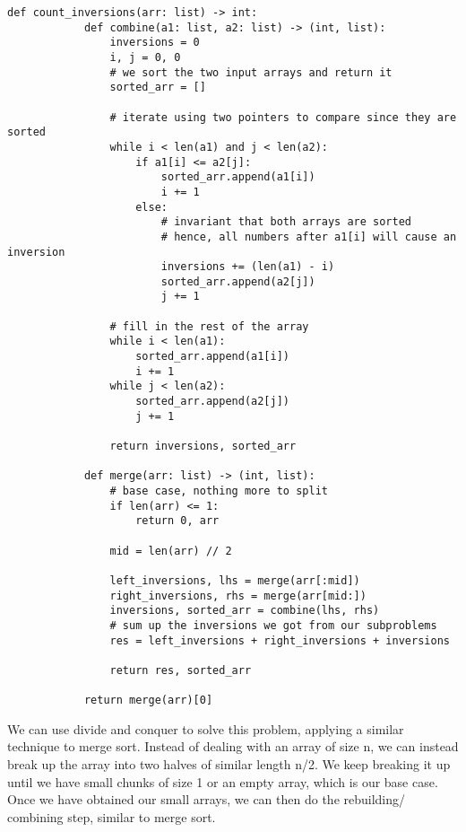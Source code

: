 \documentclass[12pt,letterpaper]{article}
\begin{document}
    \begin{lstlisting}[style = Python]
        def count_inversions(arr: list) -> int:
            def combine(a1: list, a2: list) -> (int, list):
                inversions = 0
                i, j = 0, 0
                # we sort the two input arrays and return it
                sorted_arr = []

                # iterate using two pointers to compare since they are sorted 
                while i < len(a1) and j < len(a2):
                    if a1[i] <= a2[j]:
                        sorted_arr.append(a1[i])
                        i += 1
                    else:
                        # invariant that both arrays are sorted
                        # hence, all numbers after a1[i] will cause an inversion
                        inversions += (len(a1) - i)
                        sorted_arr.append(a2[j])
                        j += 1
        
                # fill in the rest of the array
                while i < len(a1):
                    sorted_arr.append(a1[i])
                    i += 1
                while j < len(a2):
                    sorted_arr.append(a2[j])
                    j += 1
                    
                return inversions, sorted_arr
            
            def merge(arr: list) -> (int, list):
                # base case, nothing more to split
                if len(arr) <= 1:
                    return 0, arr
                
                mid = len(arr) // 2

                left_inversions, lhs = merge(arr[:mid])
                right_inversions, rhs = merge(arr[mid:])
                inversions, sorted_arr = combine(lhs, rhs)
                # sum up the inversions we got from our subproblems
                res = left_inversions + right_inversions + inversions
                
                return res, sorted_arr
            
            return merge(arr)[0]
  \end{lstlisting}

    We can use divide and conquer to solve this problem, applying a similar technique to merge sort.
    Instead of dealing with an array of size n, we can instead break up the array into two halves of similar length n/2. 
    We keep breaking it up until we have small chunks of size 1 or an empty array, which is our base case.
    Once we have obtained our small arrays, we can then do the rebuilding/ combining step, similar to merge sort. \\
    
\end{document}
